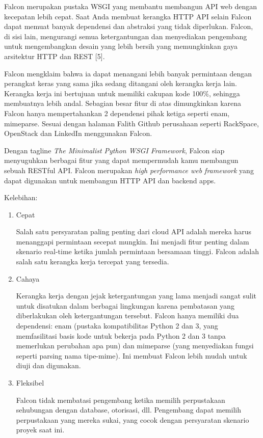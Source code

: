 Falcon merupakan pustaka WSGI yang membantu membangun API web dengan kecepatan lebih cepat. Saat Anda membuat kerangka HTTP API selain Falcon dapat memuat banyak dependensi dan abstraksi yang tidak diperlukan. Falcon, di sisi lain, mengurangi semua ketergantungan dan menyediakan pengembang untuk mengembangkan desain yang lebih bersih yang memungkinkan gaya arsitektur HTTP dan REST [5].

Falcon mengklaim bahwa ia dapat menangani lebih banyak permintaan dengan perangkat keras yang sama jika sedang ditangani oleh kerangka kerja lain. Kerangka kerja ini bertujuan untuk memiliki cakupan kode 100\%, sehingga membuatnya lebih andal. Sebagian besar fitur di atas dimungkinkan karena Falcon hanya mempertahankan 2 dependensi pihak ketiga seperti enam, mimeparse. Sesuai dengan halaman Falith Github perusahaan seperti RackSpace, OpenStack dan LinkedIn menggunakan Falcon.

Dengan tagline \textit{The Minimalist Python WSGI Framework}, Falcon siap menyuguhkan berbagai fitur yang dapat mempermudah kamu membangun sebuah RESTful API. Falcon merupakan \textit{high performance web framework} yang dapat digunakan untuk membangun HTTP API dan backend apps. %

Kelebihan:
\begin{enumerate}
\item Cepat

Salah satu persyaratan paling penting dari cloud API adalah mereka harus menanggapi permintaan secepat mungkin. Ini menjadi fitur penting dalam skenario real-time ketika jumlah permintaan bersamaan tinggi. Falcon adalah salah satu kerangka kerja tercepat yang tersedia.

\item Cahaya

Kerangka kerja dengan jejak ketergantungan yang lama menjadi sangat sulit untuk disatukan dalam berbagai lingkungan karena pembatasan yang diberlakukan oleh ketergantungan tersebut. Falcon hanya memiliki dua dependensi: enam (pustaka kompatibilitas Python 2 dan 3, yang memfasilitasi basis kode untuk bekerja pada Python 2 dan 3 tanpa memerlukan perubahan apa pun) dan mimeparse (yang menyediakan fungsi seperti parsing nama tipe-mime). Ini membuat Falcon lebih mudah untuk diuji dan digunakan.

\item Fleksibel

Falcon tidak membatasi pengembang ketika memilih perpustakaan sehubungan dengan database, otorisasi, dll. Pengembang dapat memilih perpustakaan yang mereka sukai, yang cocok dengan persyaratan skenario proyek saat ini.
\end{enumerate}

